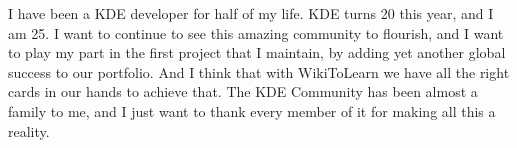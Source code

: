 I have been a KDE developer for half of my life. KDE turns 20 this year, and I am 25. I want to continue to see this amazing community to flourish, and I want to play my part in the first project that I maintain, by adding yet another global success to our portfolio. And I think that with WikiToLearn we have all the right cards in our hands to achieve that.
The KDE Community has been almost a family to me, and I just want to thank every member of it for making all this a reality.
